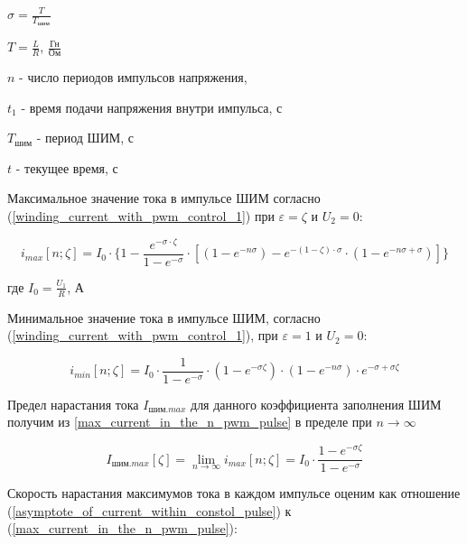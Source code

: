 $\sigma = \frac{ T }{ T_\textit{шим} }$

$T = \frac{ L }{ R }$, $\frac{\textit{Гн}}{\textit{Ом}}$

$n$ - число периодов импульсов напряжения,

$t_{1}$ - время подачи напряжения внутри импульса, с

$T_\textit{шим}$ - период ШИМ, с

$t$ - текущее время, с

Максимальное значение тока в импульсе ШИМ согласно (\ref{winding_current_with_pwm_control_1}) при
$\varepsilon = \zeta$ и $U_{2} = 0$:

\begin{equation}
    \label{max_current_in_the_n_pwm_pulse}
    i_{max}[n; \zeta] =
        I_{0}
            \cdot \{ 1
                     - \frac{ e^{-\sigma \cdot \zeta} }{ 1 - e^{-\sigma} }
                       \cdot [ (1 - e^{-n\sigma})
                               - e^{ -(1 - \zeta) \cdot \sigma }
                                    \cdot ( 1 - e^{-n\sigma + \sigma} )
                             ]
                  \}
\end{equation}

где $I_{0} = \frac{ U_{1} }{ R }$, А

Минимальное значение тока в импульсе ШИМ, согласно (\ref{winding_current_with_pwm_control_1}), при
$\varepsilon = 1$ и $U_{2} = 0$:

\begin{equation}
    \label{min_current_in_the_n_pwm_pulse}
    i_{min}[n; \zeta] =
        I_{0}
            \cdot \frac{ 1 }{ 1-e^{-\sigma} }
            \cdot (1 - e^{-\sigma\zeta})
            \cdot (1 - e^{-n\sigma})
            \cdot e^{-\sigma + \sigma\zeta}
\end{equation}

Предел нарастания тока $I_{\textit{шим}.max}$ для данного коэффициента заполнения ШИМ получим из
\ref{max_current_in_the_n_pwm_pulse} в пределе при $n \to \infty$

\begin{equation}
    \label{asymptote_of_current_within_constol_pulse}
    I_{\textit{шим}.max}[\zeta]=
        \lim_{n \to \infty} i_{max} [n; \zeta] =
            I_{0} \cdot \frac{ 1 - e^{-\sigma\zeta} }{ 1 - e^{-\sigma}}
\end{equation}

Скорость нарастания максимумов тока в каждом импульсе оценим как отношение
(\ref{asymptote_of_current_within_constol_pulse}) к (\ref{max_current_in_the_n_pwm_pulse}):

